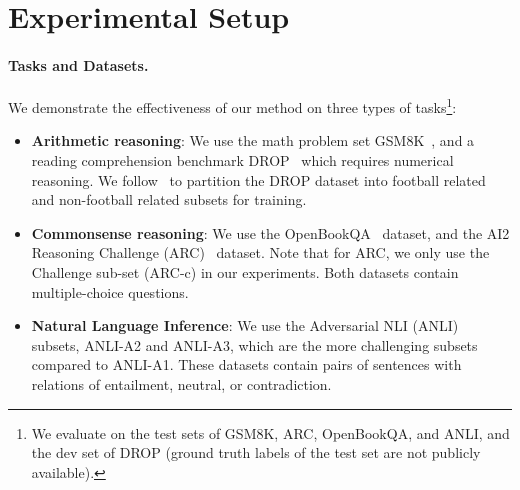 \documentclass{article} %
\begin{document}
\section{Experimental Setup}\label{sec:setup}

\paragraph{Tasks and Datasets.} 
We demonstrate the effectiveness of our method on three types of tasks\footnote{We evaluate on the test sets of GSM8K, ARC, OpenBookQA, and ANLI, and the dev set of DROP (ground truth labels of the test set are not publicly available).}:
\begin{itemize}[leftmargin=*]
\item \textbf{Arithmetic reasoning}: We use the math problem set GSM8K~\citep{Cobbe2021TrainingVT}, and a reading comprehension benchmark DROP~\citep{Dua2019DROPAR} which requires numerical reasoning. We follow~\cite{Zhou2022LeasttoMostPE} to partition the DROP dataset into football related and non-football related subsets for training.
\item \textbf{Commonsense reasoning}: We use the OpenBookQA~\citep{Mihaylov2018CanAS} dataset, and the AI2 Reasoning Challenge (ARC)~\citep{Clark2018ThinkYH} dataset. Note that for ARC, we only use the Challenge sub-set (ARC-c) in our experiments. Both datasets contain multiple-choice questions.
\item \textbf{Natural Language Inference}: We use the Adversarial NLI (ANLI)~\citep{Mihaylov2018CanAS} subsets, ANLI-A2 and ANLI-A3, which are the more challenging subsets compared to ANLI-A1. These datasets contain pairs of sentences with relations of entailment, neutral, or contradiction. 
\end{itemize}
\end{document}
